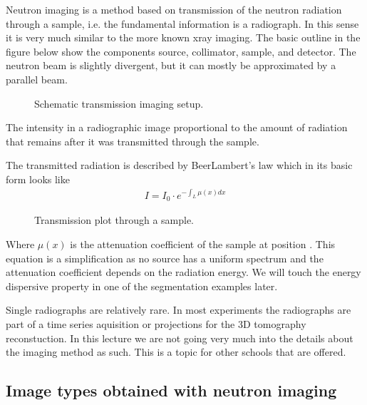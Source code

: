 \documentclass[letterpaper,10pt,english]{sphinxmanual}
\begin{document}
Neutron imaging is a method based on transmission of the neutron radiation through a sample, i.e. the fundamental information is a radiograph. In this sense it is very much similar to the more known x\sphinxhyphen{}ray imaging. The basic outline in the figure below show the components source, collimator, sample, and detector. The neutron beam is slightly divergent, but it can mostly be approximated by a parallel beam.

\begin{figure}[htbp]
\centering
\capstart

\noindent{}
\caption{Schematic transmission imaging setup.}\label{\detokenize{ML4NeutronImageSegmentation:id2}}\end{figure}

The intensity in a radiographic image proportional to the amount of radiation that remains after it was transmitted through the sample.

The transmitted radiation is described by Beer\sphinxhyphen{}Lambert’s law which in its basic form looks like
\begin{equation*}
\begin{split}I=I_0\cdot{}e^{-\int_L \mu{}(x) dx}\end{split}
\end{equation*}
\begin{figure}[htbp]
\centering
\capstart

\noindent{}
\caption{Transmission plot through a sample.}\label{\detokenize{ML4NeutronImageSegmentation:id3}}\end{figure}

Where \(\mu(x)\) is the attenuation coefficient of the sample at position . This equation is a simplification as no source has a uniform spectrum and the attenuation coefficient depends on the radiation energy. We will touch the energy dispersive property in one of the segmentation examples later.

Single radiographs are relatively rare. In most experiments the radiographs are part of a time series aquisition or projections for the 3D tomography reconstuction. In this lecture we are not going very much into the details about the imaging method as such. This is a topic for other schools that are offered.


\subsection{Image types obtained with neutron imaging}
\label{\detokenize{ML4NeutronImageSegmentation:image-types-obtained-with-neutron-imaging}}
\end{document}
